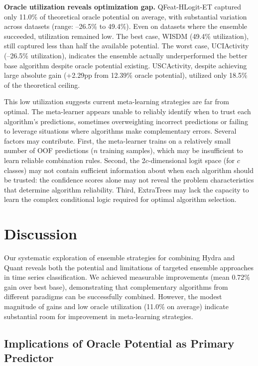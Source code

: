 \documentclass[pdflatex,sn-basic]{sn-jnl}           %
\theoremstyle{thmstyleone}%
\theoremstyle{thmstyletwo}%
\theoremstyle{thmstylethree}%
\begin{document}
\textbf{Oracle utilization reveals optimization gap.} QFeat-HLogit-ET captured only 11.0\% of theoretical oracle potential on average, with substantial variation across datasets (range: --26.5\% to 49.4\%). Even on datasets where the ensemble succeeded, utilization remained low. The best case, WISDM (49.4\% utilization), still captured less than half the available potential. The worst case, UCIActivity (--26.5\% utilization), indicates the ensemble actually underperformed the better base algorithm despite oracle potential existing. USCActivity, despite achieving large absolute gain (+2.29pp from 12.39\% oracle potential), utilized only 18.5\% of the theoretical ceiling.

This low utilization suggests current meta-learning strategies are far from optimal. The meta-learner appears unable to reliably identify when to trust each algorithm's predictions, sometimes overweighting incorrect predictions or failing to leverage situations where algorithms make complementary errors. Several factors may contribute. First, the meta-learner trains on a relatively small number of OOF predictions ($n$ training samples), which may be insufficient to learn reliable combination rules. Second, the 2$c$-dimensional logit space (for $c$ classes) may not contain sufficient information about when each algorithm should be trusted: the confidence scores alone may not reveal the problem characteristics that determine algorithm reliability. Third, ExtraTrees may lack the capacity to learn the complex conditional logic required for optimal algorithm selection.

\clearpage

\section{Discussion}\label{sec6}

Our systematic exploration of ensemble strategies for combining Hydra and Quant reveals both the potential and limitations of targeted ensemble approaches in time series classification. We achieved measurable improvements (mean 0.72\% gain over best base), demonstrating that complementary algorithms from different paradigms can be successfully combined. However, the modest magnitude of gains and low oracle utilization (11.0\% on average) indicate substantial room for improvement in meta-learning strategies.

\subsection{Implications of Oracle Potential as Primary Predictor}
\end{document}

